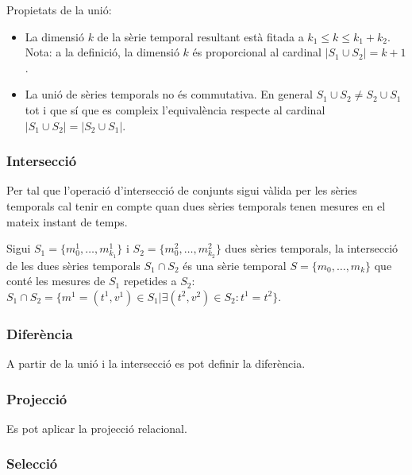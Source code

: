 Propietats de la unió:

\begin{itemize}
\item La dimensió $k$ de la sèrie temporal resultant està fitada a
  $k_1 \leq k \leq k_1 + k_2$. Nota: a la definició, la dimensió $k$ és
  proporcional al cardinal $|S_1\cup S_2| = k+1$.
\item La unió de sèries temporals no és commutativa. En general
  $S_1\cup S_2 \neq S_2\cup S_1$ tot i que sí que es compleix
  l'equivalència respecte al cardinal $|S_1\cup S_2| = |S_2\cup S_1|$.
\end{itemize}



\subsubsection{Intersecció}

Per tal que l'operació d'intersecció de conjunts sigui vàlida per les sèries
temporals cal tenir en compte quan dues sèries temporals tenen mesures
en el mateix instant de temps.

\begin{definition}[intersecció]
  Sigui $S_1=\{m_0^1, \dotsc, m_{k_1}^1\}$ i $S_2=\{m_0^2, \dotsc,
  m_{k_2}^2\}$ dues sèries temporals, la intersecció de les dues
  sèries temporals $S_1 \cap S_2$ és una sèrie temporal $S=\{m_0,
  \dotsc, m_k\}$ que conté les mesures de $S_1$ repetides a $S_2$:
  $S_1 \cap S_2 = \{ m^1 = (t^1,v^1) \in S_1 | \exists (t^2,v^2)\in
  S_2 : t^1 = t^2\}$.
\end{definition}


\subsubsection{Diferència}

A partir de la unió i la intersecció es pot definir la diferència.



\subsubsection{Projecció}


Es pot aplicar la projecció relacional.


\subsubsection{Selecció}


